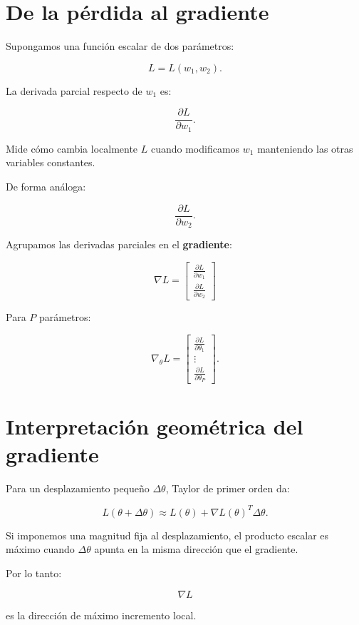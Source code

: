 \documentclass[
  letterpaper,
  DIV=11,
  numbers=noendperiod]{scrartcl}
\begin{document}
\section{De la pérdida al
gradiente}\label{de-la-puxe9rdida-al-gradiente}

Supongamos una función escalar de dos parámetros:

\[
L=L(w_1,w_2).
\]

La derivada parcial respecto de \(w_1\) es:

\[
\frac{\partial L}{\partial w_1}.
\]

Mide cómo cambia localmente \(L\) cuando modificamos \(w_1\) manteniendo
las otras variables constantes.

De forma análoga:

\[
\frac{\partial L}{\partial w_2}.
\]

Agrupamos las derivadas parciales en el \textbf{gradiente}:

\[
\boxed{
\nabla L
=
\begin{bmatrix}
\frac{\partial L}{\partial w_1}\\[5pt]
\frac{\partial L}{\partial w_2}
\end{bmatrix}
}
\]

Para \(P\) parámetros:

\[
\nabla_\theta L
=
\begin{bmatrix}
\frac{\partial L}{\partial\theta_1}\\
\vdots\\
\frac{\partial L}{\partial\theta_P}
\end{bmatrix}.
\]

\section{Interpretación geométrica del
gradiente}\label{interpretaciuxf3n-geomuxe9trica-del-gradiente}

Para un desplazamiento pequeño \(\Delta\theta\), Taylor de primer orden
da:

\[
L(\theta+\Delta\theta)
\approx
L(\theta)
+
\nabla L(\theta)^T\Delta\theta.
\]

Si imponemos una magnitud fija al desplazamiento, el producto escalar es
máximo cuando \(\Delta\theta\) apunta en la misma dirección que el
gradiente.

Por lo tanto:

\[
\nabla L
\]

es la dirección de máximo incremento local.
\end{document}
